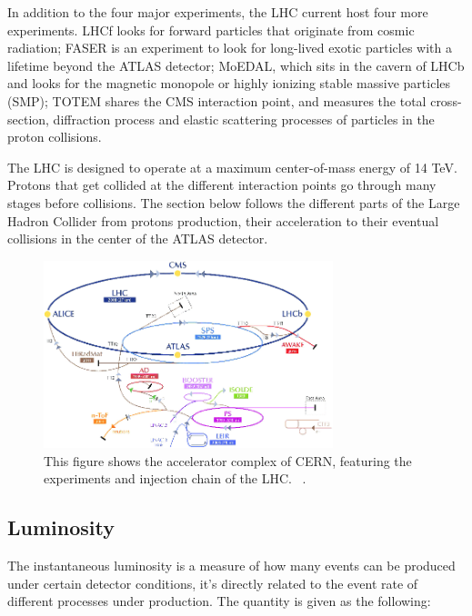 In addition to the four major experiments, the LHC current host four more experiments. LHCf looks for forward particles that originate from cosmic radiation; FASER is an experiment to look for long-lived exotic particles with a lifetime beyond the ATLAS detector; MoEDAL, which sits in the cavern of LHCb and looks for the magnetic monopole or highly ionizing stable massive particles (SMP); TOTEM shares the CMS interaction point, and measures the total
cross-section, diffraction process and elastic scattering processes of particles in the proton collisions. 

The LHC is designed to operate at a maximum center-of-mass energy of 14 TeV. Protons that get collided at the different interaction points go through many stages before collisions. The section below follows the different parts of the Large Hadron Collider from protons production, their acceleration to their eventual collisions in the center of the ATLAS detector. 

\begin{figure}[!htb]
    \begin{center}
        \includegraphics[width=0.75\textwidth]{figures/chapter_ATLAS/LHCAcceleratorComplex}
        \caption{
			This figure shows the accelerator complex of CERN, featuring the experiments and injection chain of the LHC. ~\cite{Marcastel:1621583}.
        }
        \label{fig:CERNAcceleratorComplex}
    \end{center}
\end{figure}

\subsection{Luminosity}

The instantaneous luminosity is a measure of how many events can be produced under certain detector conditions, it's directly related to the event rate of different processes under production.   
The quantity is given as the following:

